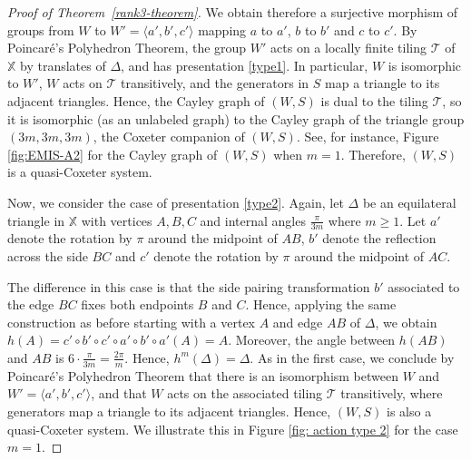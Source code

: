\documentclass[A4paper, oneside]{amsart}
\newcommand{\id}{\textit{e}}
\newcommand{\X}{\mathbb{X}}
\theoremstyle{definition}
\begin{document}
\begin{proof}[Proof of Theorem~\ref{rank3-theorem}]
We obtain therefore a surjective morphism of groups from $W$ to $W'=\langle a',b',c'\rangle$ mapping $a$ to $a'$, $b$ to $b'$ and $c$ to $c'$. By Poincaré's Polyhedron Theorem, the group $W'$ acts on a locally finite tiling $\mathcal{T}$ of $\X$ by translates of $\Delta$, and has presentation \ref{type1}. In particular, $W$ is isomorphic to $W'$, $W$ acts on  $\mathcal{T}$ transitively, and the generators in $S$ map a triangle to its adjacent triangles. Hence, the Cayley graph of $(W,S)$ is dual to the tiling $\mathcal{T}$, so it is isomorphic (as an unlabeled graph) to the Cayley graph of the triangle group $(3m,3m,3m)$, the Coxeter companion of $(W,S)$. See, for instance, Figure \ref{fig:EMIS-A2} for the Cayley graph of $(W,S)$ when $m=1$. Therefore, $(W,S)$ is a quasi-Coxeter system.  

\medskip

Now, we consider the case of presentation \ref{type2}. Again, let $\Delta$ be an equilateral triangle in $\X$ with vertices $A,B,C$ and internal angles $\frac{\pi}{3m}$ where $m \geq 1$. Let $a'$ denote the rotation by $\pi$ around the midpoint of $AB$, $b'$ denote the reflection across the side $BC$ and $c'$ denote the rotation by $\pi$ around the midpoint of $AC$.


The difference in this case is that the side pairing transformation $b'$ associated to the edge $BC$ fixes both endpoints $B$ and $C$. Hence, applying the same construction as before starting with a vertex $A$ and edge $AB$ of $\Delta$, we obtain $h(A)=c' \circ b' \circ c' \circ a' \circ b' \circ a'(A) = A$. Moreover, the angle between $h(AB)$ and $AB$ is $6\cdot\frac{\pi}{3m} = \frac{2\pi}{m}$. Hence, $h^m(\Delta) = \Delta$. As in the first case, we conclude by Poincar\'e's Polyhedron Theorem that there is an isomorphism between $W$ and  $W'=\langle a',b',c'\rangle$, and that $W$ acts on the associated tiling $\mathcal{T}$ transitively, where generators map a triangle to its adjacent triangles. Hence, $(W,S)$ is also a quasi-Coxeter system. We illustrate this in Figure \ref{fig: action type 2} for the case $m=1$.


\end{proof}
\end{document}

